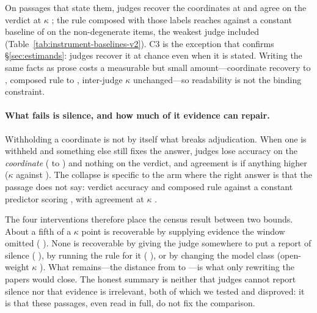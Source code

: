 \documentclass[11pt]{article}
\begin{document}
On passages that state them, judges recover the coordinates at \InsFullCoord{}
and agree on the verdict at $\kappa$ \InsFullK{}; the rule composed with those
labels reaches \InsTwoRule{} against a constant baseline of \InsTwoBase{} on the
non-degenerate items, the weakest judge included
(Table~\ref{tab:instrument-baselines-v2}). C3 is the exception that confirms
\S\ref{sec:estimands}: judges recover it at chance even when it is stated.
Writing the same facts as prose costs a measurable but small amount---coordinate
recovery \InsCanonCoord{} to \InsNatCoord{}, composed rule \InsCanonRule{} to
\InsNatRule{}, inter-judge $\kappa$ unchanged---so readability is not the
binding constraint.

\paragraph{What fails is silence, and how much of it evidence can repair.}
Withholding a coordinate is not by itself what breaks adjudication. When one is
withheld and something else still fixes the answer, judges lose accuracy on the
\emph{coordinate} (\InsFullCoord{} to \InsBalCoord{}) and nothing on the
verdict, and agreement is if anything higher ($\kappa$ \InsBalK{} against
\InsFullK{}). The collapse is specific to the arm where the right answer is that
the passage does not say: verdict accuracy \InsForceJudge{} and composed rule
\InsForceRule{} against a constant predictor scoring \InsForceBase{}, with
agreement at $\kappa$ \InsForceK{}.

The four interventions therefore place the census result between two bounds.
About a fifth of a $\kappa$ point is recoverable by supplying evidence the
window omitted (\LadVdDeltaCite{} \LadVdDeltaCiteCI{}). None is recoverable by
giving the judge somewhere to put a report of silence (\AbsKDiff{}
\AbsKDiffCI{}), by running the rule for it (\RuleKDiff{} \RuleKDiffCI{}), or by
changing the model class (open-weight $\kappa$ \OwjKOpen{}). What remains---the
distance from \LadVdCiteK{} to \InsFullK{}---is what only rewriting the papers
would close. The honest summary is neither that judges cannot report silence nor
that evidence is irrelevant, both of which we tested and disproved: it is that
these passages, even read in full, do not fix the comparison.
\end{document}
